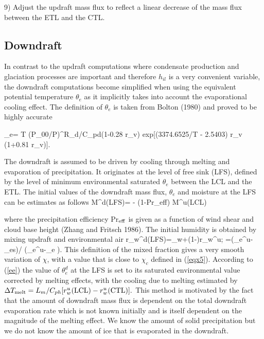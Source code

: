 9) Adjust the updraft mass flux to reflect a linear decrease of the mass
flux between the ETL and the CTL.


\subsection{Downdraft}

In contrast to the updraft computations
where condensate production and glaciation
processes are important and therefore $h_{il}$ is a very convenient
variable, the downdraft computations  become
simplified when using the equivalent potential temperature
$\theta_e$ as it implicitly takes into account the evaporational
cooling effect. The definition of $\theta_e$ is taken from Bolton (1980)
and proved to be highly accurate

\beq
\theta_e= T (P_{00}/P)^{R_d/C_{pd}(1-0.28 r_v)}
{\rm exp}[(3374.6525/T - 2.5403) r_v (1+0.81 r_v)].
\eeq

\noindent
The downdraft is assumed to be driven by cooling through melting and
evaporation of precipitation.
It originates at the level of free sink (LFS),
defined by the level of minimum environmental saturated $\theta_e$
between the LCL and the ETL.
The initial values of the downdraft mass flux, $\theta_e$ and moisture at
the LFS can be estimates as follows
\beq
M^d(LFS)= - (1-{\rm Pr_{eff}}) M^u(LCL)
\eeq

\noindent
where the precipitation efficiency Pr$_{\rm eff}$ is given as a function
of wind shear and cloud base height (Zhang and Fritsch 1986).
The initial humidity is obtained by mixing updraft and environmental air
\beq
r_w^d({\rm LFS})=\chi {}_w+(1-\chi)r_w^u; \quad
\chi=(\theta_e^u-\overline{\theta}_{es})/
(\theta_e^u-\overline{\theta}_e ).
\label{ee}
\eeq
\noindent
 This definition of the mixed fraction
 gives a very smooth variation of $\chi$, with a value
 that is close to $\chi_c$ defined in (\ref{eqx5}).
According to (\ref{ee})  the value of $\theta_e^d$ at the LFS is
set to its saturated environmental value corrected by melting effects,
with  the cooling due to melting estimated by
$\Delta T_{\rm melt}=
L_m/C_{ph}[r_w^u({\rm LCL})-r_w^u({\rm CTL})].
$
 This method is motivated by the fact
that the amount of downdraft mass flux is dependent on the total downdraft
evaporation rate which is not known initially and is itself dependent on
the magnitude of the melting effect. We know the amount of solid
precipitation but we do not know the amount of ice that is evaporated in
the downdraft.


